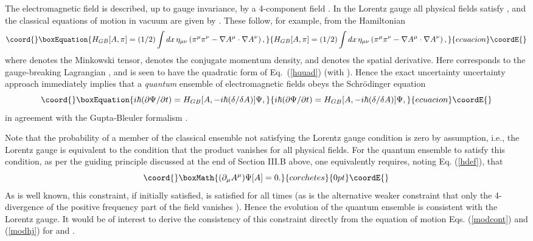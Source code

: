 \documentclass[a4paper,preprint, showpacs, aps, draft]{revtex4}
\begin{document}
{The electromagnetic field is described, up to gauge invariance, 
by a 4-component field
\coordHE{}.  In the Lorentz gauge all physical fields satisfy 
\coordHE{}, and the classical 
equations of motion in vacuum are
given by \coordHE{}.  These follow,
for example, from the Hamiltonian \cite{schweber} 
\begin{equation}\coord{}\boxEquation{ \label{emham}
H_{GB}[A,\pi] =
(1/2)\int dx\, \eta_{\mu\nu}\left(\pi^\mu\pi^\nu - \nabla A^\mu\cdot\nabla
A^\nu\right) ,
}{ H_{GB}[A,\pi] =
(1/2)\int dx\, \eta_{\mu\nu}\left(\pi^\mu\pi^\nu - \nabla A^\mu\cdot\nabla
A^\nu\right) ,
}{ecuacion}\coordE{}\end{equation}
where \myHighlight{$\eta_{\mu\nu}$}\coordHE{} denotes the Minkowski tensor, \myHighlight{$\pi^\mu$}\coordHE{} denotes
the conjugate momentum density, and \myHighlight{$\nabla$}\coordHE{} denotes the spatial
derivative. Here \coordHE{} corresponds to the gauge-breaking 
Lagrangian \coordHE{}, and is seen 
to have the quadratic form of Eq.~(\ref{hquad}) 
(with \coordHE{}).  Hence the exact uncertainty  
uncertainty approach immediately implies that 
a {\it quantum} ensemble of electromagnetic fields obeys the Schr\"{o}dinger
equation
\begin{equation}\coord{}\boxEquation{
i\hbar(\partial\Psi/\partial t) = H_{GB}[A,-i\hbar(\delta/\delta A)]
\Psi ,
}{
i\hbar(\partial\Psi/\partial t) = H_{GB}[A,-i\hbar(\delta/\delta A)]
\Psi ,
}{ecuacion}\coordE{}\end{equation} 
in agreement with the Gupta-Bleuler formalism \cite{schweber}.

Note that the probability of a member of the classical 
ensemble not satisfying the
Lorentz gauge condition \coordHE{} is zero by
assumption, i.e., the Lorentz gauge is equivalent to the condition
that the product \coordHE{} vanishes for all
physical fields.  For the quantum ensemble to satisfy this 
condition, as per the guiding principle discussed at the end of
Section III.B above, one equivalently requires,
noting Eq. (\ref{hdef}), that 
\[\coord{}\boxMath{
(\partial_\mu A^\mu) \Psi[A] =0 .}{corchetes}{0pt}\coordE{}\]
As is well known, this constraint, if initially satisfied, is satisfied
for all times \cite{dirac} (as is the alternative weaker constraint that
only the 4-divergence of the positive frequency part of the field vanishes
\cite{schweber}). Hence the evolution of the quantum
ensemble is consistent with the Lorentz gauge.
It would be of interest to derive the consistency of this constraint
directly from the equation of motion Eqs. (\ref{modcont}) and
(\ref{modhj}) for \coordHE{} and \coordHE{}.
 
}
\end{document}
